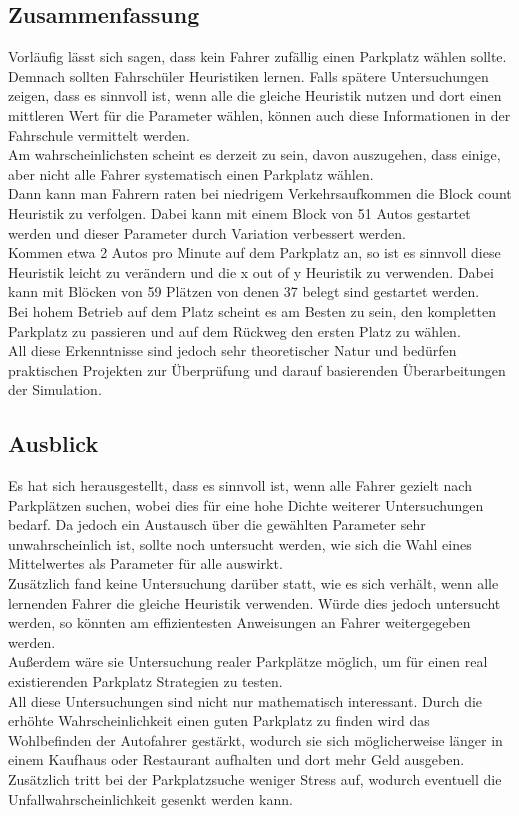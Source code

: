 \subsection{Zusammenfassung}

Vorläufig lässt sich sagen, dass kein Fahrer zufällig einen Parkplatz wählen sollte. Demnach sollten Fahrschüler Heuristiken lernen. Falls spätere Untersuchungen zeigen, dass es sinnvoll ist, wenn alle die gleiche Heuristik nutzen und dort einen mittleren Wert für die Parameter wählen, können auch diese Informationen in der Fahrschule vermittelt werden.\\
Am wahrscheinlichsten scheint es derzeit zu sein, davon auszugehen, dass einige, aber nicht alle Fahrer systematisch einen Parkplatz wählen. \\
 Dann kann man Fahrern raten bei niedrigem Verkehrsaufkommen die Block count Heuristik zu verfolgen. Dabei kann mit einem Block von 51 Autos gestartet werden und dieser Parameter durch Variation verbessert werden.\\
 Kommen etwa 2 Autos pro Minute auf dem Parkplatz an, so ist es sinnvoll diese Heuristik leicht zu verändern und die x out of y Heuristik zu verwenden. Dabei kann mit Blöcken von 59 Plätzen von denen 37 belegt sind gestartet werden.\\
 Bei hohem Betrieb auf dem Platz scheint es am Besten zu sein, den kompletten Parkplatz zu passieren und auf dem Rückweg den ersten Platz zu wählen.\\
All diese Erkenntnisse sind jedoch sehr theoretischer Natur und bedürfen praktischen Projekten zur Überprüfung und darauf basierenden Überarbeitungen der Simulation. 
 
 \subsection{Ausblick}

Es hat sich herausgestellt, dass es sinnvoll ist, wenn alle Fahrer gezielt nach Parkplätzen suchen, wobei dies für eine hohe Dichte weiterer Untersuchungen bedarf. Da jedoch ein Austausch über die gewählten Parameter sehr unwahrscheinlich ist, sollte noch untersucht werden, wie sich die Wahl eines Mittelwertes als Parameter für alle auswirkt.\\
Zusätzlich fand keine Untersuchung darüber statt, wie es sich verhält, wenn alle lernenden Fahrer die gleiche Heuristik verwenden. Würde dies jedoch untersucht werden, so könnten am effizientesten Anweisungen an Fahrer weitergegeben werden. \\
Außerdem wäre sie Untersuchung realer Parkplätze möglich, um für einen real existierenden Parkplatz Strategien zu testen.\\
All diese Untersuchungen sind nicht nur mathematisch interessant. Durch die erhöhte Wahrscheinlichkeit einen guten Parkplatz zu finden wird das Wohlbefinden der Autofahrer gestärkt, wodurch sie sich möglicherweise länger in einem Kaufhaus oder Restaurant aufhalten und dort mehr Geld ausgeben. Zusätzlich tritt bei der Parkplatzsuche weniger Stress auf, wodurch eventuell die Unfallwahrscheinlichkeit gesenkt werden kann.